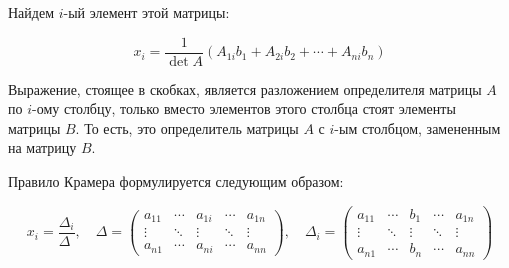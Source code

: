 Найдем $i$-ый элемент этой матрицы:

$$
x_i = \frac1{\det A}\left(A_{1i}b_1+A_{2i}b_2+\cdots+A_{ni}b_n\right)
$$

Выражение, стоящее в скобках, является разложением определителя матрицы
$A$ по $i$-ому столбцу, только вместо элементов этого столбца стоят
элементы матрицы $B$. То есть, это определитель матрицы $A$ с $i$-ым
столбцом, замененным на матрицу $B$.

Правило Крамера формулируется следующим образом:

$$
x_i = \frac{\Delta_i}{\Delta_{\phantom{i}}},\quad
\Delta=
\begin{pmatrix}
a_{11} & \cdots & a_{1i} & \cdots & a_{1n} \\
\vdots & \ddots & \vdots & \ddots & \vdots \\
a_{n1} & \cdots & a_{ni} & \cdots & a_{nn}
\end{pmatrix}
,\quad
\Delta_i=\begin{pmatrix}
a_{11} & \cdots & b_1    & \cdots & a_{1n} \\
\vdots & \ddots & \vdots & \ddots & \vdots \\
a_{n1} & \cdots & b_n    & \cdots & a_{nn}
\end{pmatrix}
$$
